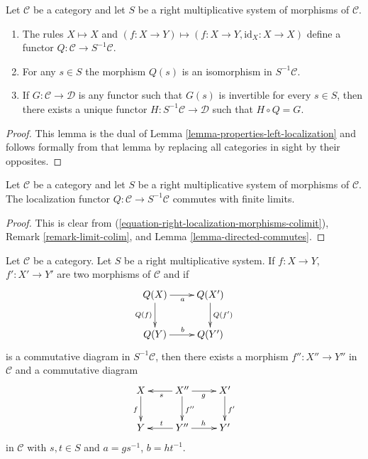 \begin{lemma}
\label{lemma-properties-right-localization}
Let $\mathcal{C}$ be a category and let $S$ be a right multiplicative
system of morphisms of $\mathcal{C}$.
\begin{enumerate}
\item The rules $X \mapsto X$ and
$(f : X \to Y) \mapsto (f : X \to Y, \text{id}_X : X \to X)$
define a functor $Q : \mathcal{C} \to S^{-1}\mathcal{C}$.
\item For any $s \in S$ the morphism $Q(s)$ is an isomorphism in
$S^{-1}\mathcal{C}$.
\item If $G : \mathcal{C} \to \mathcal{D}$ is any functor such that
$G(s)$ is invertible for every $s \in S$, then there exists a
unique functor $H : S^{-1}\mathcal{C} \to \mathcal{D}$
such that $H \circ Q = G$.
\end{enumerate}
\end{lemma}

\begin{proof}
This lemma is the dual of
Lemma \ref{lemma-properties-left-localization}
and follows formally from that lemma by replacing all
categories in sight by their opposites.
\end{proof}

\begin{lemma}
\label{lemma-right-localization-limits}
Let $\mathcal{C}$ be a category and let $S$ be a right multiplicative
system of morphisms of $\mathcal{C}$. The localization functor
$Q : \mathcal{C} \to S^{-1}\mathcal{C}$ commutes with finite limits.
\end{lemma}

\begin{proof}
This is clear from (\ref{equation-right-localization-morphisms-colimit}),
Remark \ref{remark-limit-colim}, and
Lemma \ref{lemma-directed-commutes}.
\end{proof}

\begin{lemma}
\label{lemma-right-localization-diagram}
Let $\mathcal{C}$ be a category. Let $S$ be a right multiplicative
system. If $f : X \to Y$, $f' : X' \to Y'$ are two morphisms of
$\mathcal{C}$ and if
$$
\xymatrix{
Q(X) \ar[d]_{Q(f)} \ar[r]_a & Q(X') \ar[d]^{Q(f')} \\
Q(Y) \ar[r]^b & Q(Y')
}
$$
is a commutative diagram in $S^{-1}\mathcal{C}$, then there exists
a morphism $f'' : X'' \to Y''$ in $\mathcal{C}$ and a commutative
diagram
$$
\xymatrix{
X \ar[d]_f & X'' \ar[l]^s \ar[d]^{f''} \ar[r]_g & X' \ar[d]^{f'} \\
Y & Y'' \ar[l]_t \ar[r]^h & Y'
}
$$
in $\mathcal{C}$ with $s, t \in S$ and $a = gs^{-1}$, $b = ht^{-1}$.
\end{lemma}

